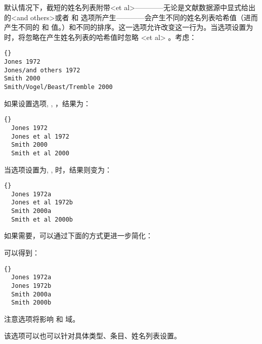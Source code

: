 \begin{optionlist}
默认情况下，截短的姓名列表附带<et al>————无论是文献数据源中显式给出的<and others>或者
 和  选项所产生————会产生不同的姓名列表哈希值（进而产生不同的 和 值。）和不同的排序。这一选项允许改变这一行为。当选项设置为时，\biber 将忽略在产生姓名列表的哈希值时忽略 <et al> 。考虑：

\begin{lstlisting}{}
Jones 1972
Jones/and others 1972
Smith 2000
Smith/Vogel/Beast/Tremble 2000
\end{lstlisting}
%
如果设置选项, , ，结果为：

\begin{lstlisting}{}
  Jones 1972
  Jones et al 1972
  Smith 2000
  Smith et al 2000
\end{lstlisting}
%
当选项设置为, , 时，结果则变为：

\begin{lstlisting}{}
  Jones 1972a
  Jones et al 1972b
  Smith 2000a
  Smith et al 2000b
\end{lstlisting}

如果需要，可以通过下面的方式更进一步简化：

\begin{ltxexample}
\end{ltxexample}
%
可以得到：

\begin{lstlisting}{}
  Jones 1972a
  Jones 1972b
  Smith 2000a
  Smith 2000b
\end{lstlisting}
%
注意选项将影响 和  域。

该选项可以也可以针对具体类型、条目、姓名列表设置。




\end{optionlist}
